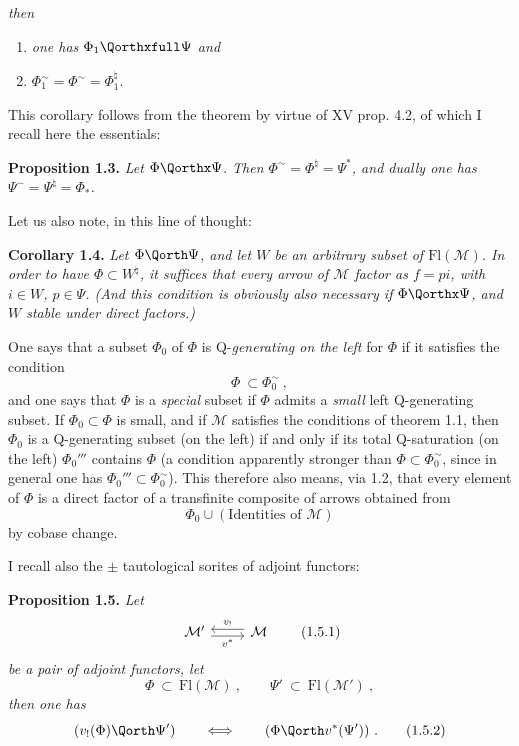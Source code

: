 
\textit{then}
\begin{enumerate}[label={}]
\item[a)] \textit{one has $\Phi_1 \Qorthxfull \Psi$ and} %
\item[b)] $\Phi_1^{\sim} = \Phi^{\sim} = \Phi_1^{\natural}$.
\end{enumerate}
This corollary follows from the theorem by virtue of XV prop. 4.2, of which I recall here the essentials:

\textbf{Proposition 1.3.} \textit{Let $\Phi \Qorthx \Psi$. Then $\Phi^{\sim} = \Phi^{\natural} = \Psi^{*}$, and dually one has $\Psi^{-} = \Psi^{\natural} = \Phi_{*}$.}

Let us also note, in this line of thought:

\textbf{Corollary 1.4.} \textit{Let $\Phi \Qorth \Psi$, and let $W$ be an arbitrary subset of $\mathrm{Fl}(\mathcal{M})$. In order to have $\Phi \subset W^{\natural}$, it suffices that every arrow of $\mathcal{M}$ factor as $f = pi$, with $i \in W$, $p \in \Psi$. (And this condition is obviously also necessary if $\Phi \Qorthx \Psi$, and $W$ stable under direct factors.)}

One says that a subset $\Phi_0$ of $\Phi$ is Q-\textit{generating on the left} for $\Phi$ if it satisfies the condition
\[
\Phi \ \subset \Phi_0^{\sim}\ , \tag*{(1.9)}
\]
and one says that $\Phi$ is a \textit{special} subset if $\Phi$ admits a \textit{small} left Q-generating subset. If $\Phi_0 \subset \Phi$ is small, and if $\mathcal{M}$ satisfies the conditions of theorem 1.1, then $\Phi_0$ is a Q-generating subset (on the left) if and only if its total Q-saturation (on the left) $\Phi_0'''$ contains $\Phi$ (a condition apparently stronger than $\Phi \subset \Phi_0^{\sim}$, since in general one has $\Phi_0''' \subset \Phi_0^{\sim}$). This therefore also means, via 1.2, that every  element of $\Phi$ is a direct factor of a transfinite composite of arrows obtained from
\[
\Phi_0 \cup (\text{Identities of } \mathcal{M})
\]
by cobase change.

I recall also the $\pm$ tautological sorites of adjoint functors:

\textbf{Proposition 1.5.} \textit{Let}
\[
\begin{tikzcd}
\mathcal{M}' \arrow[r, shift right=1, "v^{*}"'] & \mathcal{M} \arrow[l, shift right=1, "v_{!}"']
\end{tikzcd}
\tag*{(1.5.1)}
\]
\textit{be a pair of adjoint functors, let}
\[
\Phi \ \subset\ \mathrm{Fl}(\mathcal{M})\ , \qquad \Psi' \ \subset\ \mathrm{Fl}(\mathcal{M}')\ ,
\]
\textit{then one has}
\[
(v_{!}(\Phi) \Qorth \Psi') \qquad \Longleftrightarrow \qquad (\Phi \Qorth v^{*}(\Psi'))\ . \tag*{(1.5.2)}
\]

